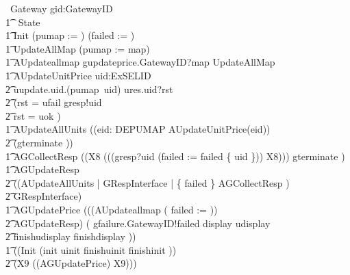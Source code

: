 \begin{circus}
	\circprocess\ Gateway \circdef gid:GatewayID \circspot \circbegin \\

    	\t1 \circstate\ State \\

    	\t1	Init \circdef (pumap := \emptyset) \circseq (failed := \emptyset)\\

        \t1 UpdateAllMap \circdef  (pumap := map)\\

        \t1 AUpdateallmap \circdef gupdateprice.GatewayID?map \then  UpdateAllMap \\
        \t1 AUpdateUnitPrice \circdef uid:ExSELID \circspot \\
            \t2 uupdate.uid.(pumap~uid) \then ures.uid?rst \then \\
            \t2 (\lcircguard rst = ufail \rcircguard \circguard gresp!uid \then \Skip \\
            \t2 \extchoice \lcircguard rst = uok \rcircguard \circguard \Skip)\\

        \t1 AUpdateAllUnits \circdef ((\Interleave eid: DEPUMAP  \circspot AUpdateUnitPrice(eid)) \\
        \t2 \circseq (gterminate \then \Skip)) \\

        \t1 AGCollectResp \circdef ((\circmu X8 \circspot (((gresp?uid \then (failed := failed \cup \{ uid \})) \circseq X8))) \extchoice gterminate \then \Skip) \\

        \t1 AGUpdateResp \circdef \\
            \t2 ((AUpdateAllUnits \lpar \emptyset | GRespInterface | \{ failed \} \rpar AGCollectResp ) \\
            \t2 \circhide GRespInterface) \\

        \t1 AGUpdatePrice \circdef (((AUpdateallmap \circseq( failed := \emptyset)) \circseq \\
            \t2 AGUpdateResp) \circseq( gfailure.GatewayID!failed \then display \then udisplay \then \\
            \t2 finishudisplay \then finishdisplay \then \Skip)) \\

	\t1 \circspot  ((Init \circseq (init \then uinit \then finishuinit \then finishinit \then \Skip)) \circseq \\
    \t2 (\circmu X9 \circspot ((AGUpdatePrice) \circseq X9))) \\

	\circend
\end{circus}

